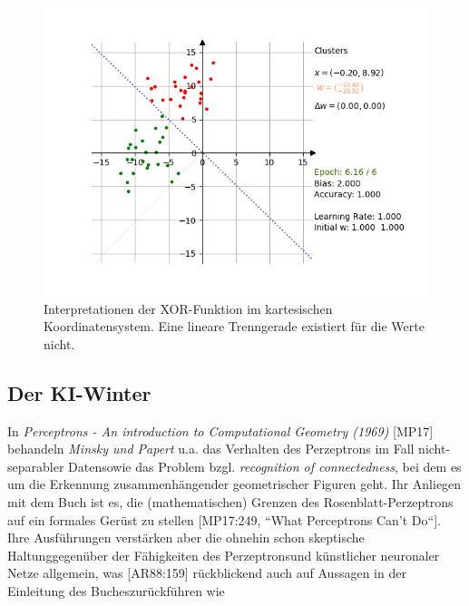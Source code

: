 \begin{figure}[h]
    \centering
    \includegraphics{images/rosenblatt/blob_success.png}
    \caption{Interpretationen der XOR-Funktion im kartesischen Koordinatensystem. Eine lineare Trenngerade existiert für die Werte nicht.}
    \label{fig-rp-xor}
\end{figure}

\subsection{Der KI-Winter}\label{kiwinter}

In \textit{Perceptrons - An introduction to Computational Geometry (1969)} [MP17] behandeln \textit{Minsky und Papert} u.a. das Verhalten des Perzeptrons im Fall nicht-separabler Daten\footnotemark[35] sowie das Problem bzgl. \textit{recognition of connectedness}\footnotemark[36], bei dem es um die Erkennung zusammenhängender geometrischer Figuren geht.
Ihr Anliegen mit dem Buch ist es, die (mathematischen) Grenzen des Rosenblatt-Perzeptrons auf ein formales Gerüst zu stellen [MP17:249, ``What Perceptrons Can't Do``].
Ihre Ausführungen verstärken aber die ohnehin schon skeptische Haltung\footnotemark[37] gegenüber der Fähigkeiten des Perzeptrons\footnotemark[38] und künstlicher neuronaler Netze allgemein, was [AR88:159] rückblickend auch auf Aussagen in der Einleitung des Buches\footnotemark[39] zurückführen wie


